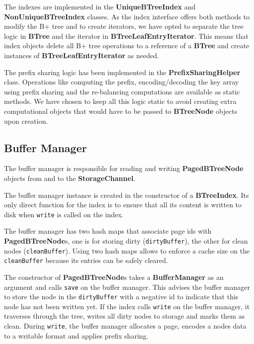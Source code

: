 \documentclass[11pt,a4paper,oneside]{article}
\begin{document}
The indexes are implemented in the \textbf{UniqueBTreeIndex} and \textbf{NonUniqueBTreeIndex} classes. As the index interface offers both methods to modify the B+ tree and to create iterators, we have opted to separate the tree logic in \textbf{BTree} and the iterator in \textbf{BTreeLeafEntryIterator}. This means that index objects delete all B+ tree operations to a reference of a \textbf{BTree} and create instances of \textbf{BTreeLeafEntryIterator} as needed.

The prefix sharing logic has been implemented in the \textbf{PrefixSharingHelper} class. Operations like computing the prefix, encoding/decoding the key array using prefix sharing and the re-balancing computations are available as static methods. We have chosen to keep all this logic static to avoid creating extra computational objects that would have to be passed to \textbf{BTreeNode} objects upon creation.

\subsection{Buffer Manager} %
\label{sub:buffer_manager}
The buffer manager is responsible for reading and writing \textbf{PagedBTreeNode} objects from and to the \textbf{StorageChannel}.

The buffer manager instance is created in the constructor of a \textbf{BTreeIndex}. 
Its only direct function for the index is to ensure that all its content is written to disk when \texttt{write} is called on the index.

The buffer manager has two hash maps that associate page ids with \textbf{PagedBTreeNode}s, one is for storing dirty (\texttt{dirtyBuffer}), 
the other for clean nodes (\texttt{cleanBuffer}). 
Using two hash maps allows to enforce a cache size on the \texttt{cleanBuffer} because its entries can be safely cleared.

The constructor of \textbf{PagedBTreeNode}s takes a \textbf{BufferManager} as an argument and calls \texttt{save} on the buffer manager.
This advises the buffer manager to store the node in the \texttt{dirtyBuffer} with a negative id to indicate that this node has not been written yet.
If the index calls \texttt{write} on the buffer manager, it traverses through the tree, writes all dirty nodes to storage and marks them as clean.
During \texttt{write}, the buffer manager allocates a page, encodes a nodes data to a writable format and applies prefix sharing.
\end{document}
